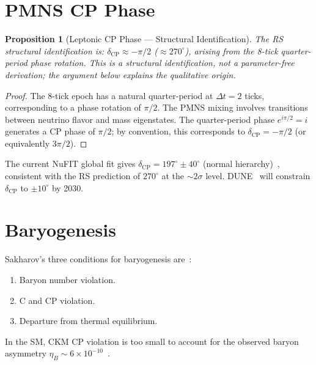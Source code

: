 \documentclass[12pt,a4paper]{article}
\newtheorem{proposition}[theorem]{Proposition}
\theoremstyle{definition}
\theoremstyle{remark}
\begin{document}
\section{PMNS CP Phase}
\label{sec:pmns}

\begin{proposition}[Leptonic CP Phase --- Structural Identification]
\label{prop:pmns-cp}
The RS structural identification is:
$\delta_{\mathrm{CP}} \approx -\pi/2$ ($\approx 270^\circ$),
arising from the 8-tick quarter-period phase rotation.
This is a structural identification, not a parameter-free derivation;
the argument below explains the qualitative origin.
\end{proposition}

\begin{proof}
The 8-tick epoch has a natural quarter-period at
$\Delta t = 2$ ticks, corresponding to a phase rotation of
$\pi/2$.  The PMNS mixing involves transitions between
neutrino flavor and mass eigenstates.  The quarter-period
phase $e^{i\pi/2} = i$ generates a CP phase of $\pi/2$;
by convention, this corresponds to
$\delta_{\mathrm{CP}} = -\pi/2$ (or equivalently $3\pi/2$).
\end{proof}

The current NuFIT global fit gives
$\delta_{\mathrm{CP}} = 197^\circ \pm 40^\circ$ (normal
hierarchy)~\cite{NuFIT}, consistent with the RS prediction
of $270^\circ$ at the $\sim 2\sigma$ level.
DUNE~\cite{DUNE} will constrain $\delta_{\mathrm{CP}}$ to
$\pm 10^\circ$ by 2030.

\section{Baryogenesis}
\label{sec:baryogenesis}

Sakharov's three conditions for baryogenesis are~\cite{Sakharov1967}:
\begin{enumerate}
  \item Baryon number violation.
  \item C and CP violation.
  \item Departure from thermal equilibrium.
\end{enumerate}

In the SM, CKM CP violation is too small to account for the
observed baryon asymmetry
$\eta_B \sim 6 \times 10^{-10}$~\cite{Planck2018}.
\end{document}
